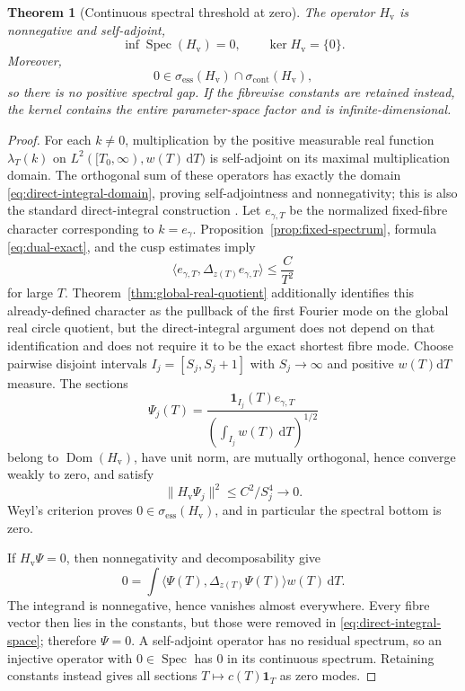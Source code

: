 \documentclass[11pt]{article}
\numberwithin{equation}{section}
\newtheorem{theorem}{Theorem}[section]
\theoremstyle{definition}
\theoremstyle{remark}
\newcommand{\Spec}{\operatorname{Spec}}
\newcommand{\dd}{\mathrm d}
\begin{document}
\begin{theorem}[Continuous spectral threshold at zero]\label{thm:direct-integral}
The operator $H_{\mathrm v}$ is nonnegative and self-adjoint,
\begin{equation}\label{eq:direct-integral-conclusion}
 \inf\Spec(H_{\mathrm v})=0,
 \qquad
 \ker H_{\mathrm v}=\{0\}.
\end{equation}
Moreover,
\begin{equation}\label{eq:direct-integral-essential}
 0\in\sigma_{\mathrm{ess}}(H_{\mathrm v})
 \cap\sigma_{\mathrm{cont}}(H_{\mathrm v}),
\end{equation}
so there is no positive spectral gap.  If the fibrewise constants are
retained instead, the kernel contains the entire parameter-space factor and
is infinite-dimensional.
\end{theorem}

\begin{proof}
For each $k\ne0$, multiplication by the positive measurable real function
$\lambda_T(k)$ on $L^2([T_0,\infty),w(T)\,\dd T)$ is self-adjoint on its
maximal multiplication domain.  The orthogonal sum of these operators has
exactly the domain \eqref{eq:direct-integral-domain}, proving
self-adjointness and nonnegativity; this is also the standard direct-integral
construction \citep[Chapter XIII]{ReedSimonIV_1978}.  Let $e_{\gamma,T}$ be
the normalized fixed-fibre character corresponding to $k=e_\gamma$.
Proposition~\ref{prop:fixed-spectrum}, formula \eqref{eq:dual-exact}, and the
cusp estimates imply
\begin{equation}\label{eq:specific-mode-energy}
 \langle e_{\gamma,T},\Delta_{z(T)}e_{\gamma,T}\rangle
 \le \frac{C}{T^2}
\end{equation}
for large $T$.  Theorem~\ref{thm:global-real-quotient} additionally identifies
this already-defined character as the pullback of the first Fourier mode on
the global real circle quotient, but the direct-integral argument does not
depend on that identification and does not require it to be the exact shortest
fibre mode.  Choose pairwise disjoint intervals $I_j=[S_j,S_j+1]$ with $S_j\to\infty$ and positive $w(T)\dd T$ measure.  The sections
\[
 \Psi_j(T)=
 \frac{\mathbf 1_{I_j}(T)e_{\gamma,T}}
 {\left(\int_{I_j}w(T)\,\dd T\right)^{1/2}}
\]
belong to $\operatorname{Dom}(H_{\mathrm v})$, have unit norm, are mutually
orthogonal, hence converge weakly to zero, and satisfy
\[
 \|H_{\mathrm v}\Psi_j\|^2
 \le C^2/S_j^4\longrightarrow0.
\]
Weyl's criterion proves $0\in\sigma_{\mathrm{ess}}(H_{\mathrm v})$, and in
particular the spectral bottom is zero.

If $H_{\mathrm v}\Psi=0$, then nonnegativity and decomposability give
\[
 0=\int\langle\Psi(T),\Delta_{z(T)}\Psi(T)\rangle w(T)\,\dd T.
\]
The integrand is nonnegative, hence vanishes almost everywhere.  Every fibre vector then lies in the constants, but those were removed in \eqref{eq:direct-integral-space}; therefore $\Psi=0$.  A self-adjoint operator has no residual spectrum, so an injective operator with $0\in\Spec$ has $0$ in its continuous spectrum.  Retaining constants instead gives all sections $T\mapsto c(T)\mathbf 1_T$ as zero modes.
\end{proof}
\end{document}
